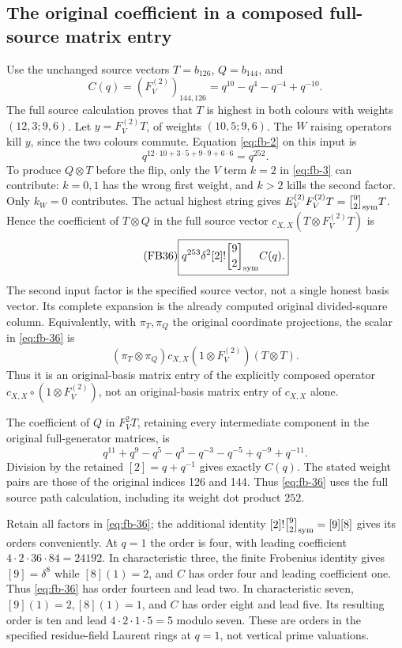 \subsection{The original coefficient in a composed full-source matrix entry}
\label{sec:fb-retained}

Use the unchanged source vectors \(T=b_{126}\), \(Q=b_{144}\), and
\[
 C(q)=(F_V^{(2)})_{144,126}
 =q^{10}-q^4-q^{-4}+q^{-10}.
\]
The full source calculation proves that \(T\) is highest in both
colours with weights \((12,3;9,6)\). Let \(y=F_V^{(2)}T\), of weights
\((10,5;9,6)\). The \(W\) raising operators kill \(y\), since the
two colours commute. Equation \eqref{eq:fb-2} on this input is
\[
 q^{12\cdot10+3\cdot5+9\cdot9+6\cdot6}=q^{252}.
\]
To produce \(Q\otimes T\) before the flip, only the \(V\) term \(k=2\)
in \eqref{eq:fb-3} can contribute: \(k=0,1\) has the wrong first weight, and
\(k>2\) kills the second factor. Only \(k_W=0\) contributes.
The actual highest string gives
\(E_V^{(2)}F_V^{(2)}T={9\brack2}_{\rm sym}T\).
Hence the coefficient of \(T\otimes Q\) in the full source vector
\(c_{X,X}(T\otimes F_V^{(2)}T)\) is
\begin{equation}\tag{FB36}\label{eq:fb-36}
\boxed{q^{253}\delta^2[2]!{9\brack2}_{\rm sym}C(q).}
\end{equation}
The second input factor is the specified source vector, not a
single honest basis vector. Its complete expansion is the already
computed original divided-square column.
Equivalently, with \(\pi_T,\pi_Q\) the original coordinate projections,
the scalar in \eqref{eq:fb-36} is
\[
 (\pi_T\otimes\pi_Q)c_{X,X}(1\otimes F_V^{(2)})(T\otimes T).
\]
Thus it is an original-basis matrix entry of the explicitly composed
operator \(c_{X,X}\circ(1\otimes F_V^{(2)})\), not an original-basis
matrix entry of \(c_{X,X}\) alone.

The coefficient of \(Q\) in \(F_V^2T\), retaining every
intermediate component in the original full-generator matrices, is
\[
 q^{11}+q^9-q^5-q^3-q^{-3}-q^{-5}+q^{-9}+q^{-11}.
\]
Division by the retained \([2]=q+q^{-1}\) gives exactly \(C(q)\).
The stated weight pairs are those of the original indices 126 and
144. Thus \eqref{eq:fb-36} uses the full source path calculation, including
its weight dot product \(252\).

Retain all factors in \eqref{eq:fb-36}; the additional identity
\([2]!{9\brack2}_{\rm sym}=[9][8]\) gives its orders conveniently.
At \(q=1\) the order is four, with leading coefficient
\(4\cdot2\cdot36\cdot84=24192\).
In characteristic three, the finite Frobenius identity gives
\([9]=\delta^8\) while \([8](1)=2\), and \(C\) has order four and
leading coefficient one. Thus \eqref{eq:fb-36} has order fourteen and lead two.
In characteristic seven, \([9](1)=2,[8](1)=1\), and \(C\) has
order eight and lead five. Its resulting order is ten and lead
\(4\cdot2\cdot1\cdot5=5\) modulo seven. These are orders in the
specified residue-field Laurent rings at \(q=1\), not vertical
prime valuations.


